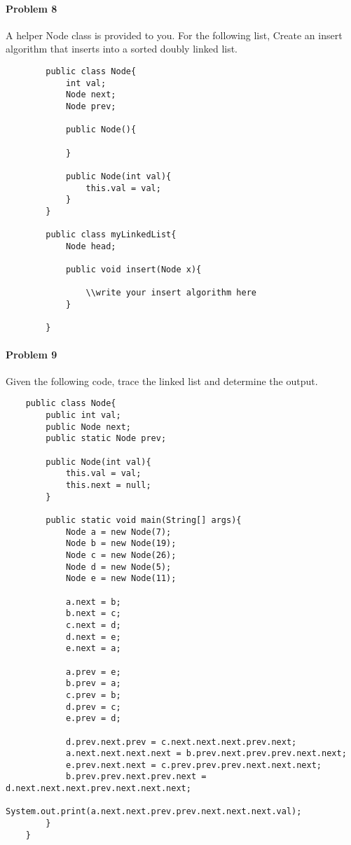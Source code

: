 \documentclass[letterpaper]{article}
\begin{document}
\paragraph{Problem 8} A helper Node class is provided to you. For the following list, Create an insert algorithm that inserts into a sorted doubly linked list.

    \begin{verbatim}
        public class Node{
            int val;
            Node next;
            Node prev;

            public Node(){
            
            }

            public Node(int val){
                this.val = val;   
            }
        }
        
        public class myLinkedList{
            Node head; 
            
            public void insert(Node x){
            	
                \\write your insert algorithm here
            }
        
        }
    \end{verbatim}  
    
\paragraph{Problem 9} Given the following code, trace the linked list and determine the output.

\begin{verbatim}
    public class Node{
        public int val;
        public Node next;
        public static Node prev;
		
        public Node(int val){
            this.val = val;
            this.next = null;
        }
		
        public static void main(String[] args){
            Node a = new Node(7);
            Node b = new Node(19);
            Node c = new Node(26);
            Node d = new Node(5);
            Node e = new Node(11);
			
            a.next = b;
            b.next = c;
            c.next = d;
            d.next = e;
            e.next = a;
			
            a.prev = e;
            b.prev = a;
            c.prev = b;
            d.prev = c;
            e.prev = d;
			
            d.prev.next.prev = c.next.next.next.prev.next;
            a.next.next.next.next = b.prev.next.prev.prev.next.next;
            e.prev.next.next = c.prev.prev.prev.next.next.next;
            b.prev.prev.next.prev.next = d.next.next.next.prev.next.next.next;
            System.out.print(a.next.next.prev.prev.next.next.next.val);
        }
    }
\end{verbatim}
\end{document}
